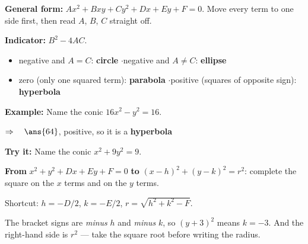 \documentclass[12pt]{article}
\begin{document}


\begin{formulabox}
\textbf{General form:} $Ax^2 + Bxy + Cy^2 + Dx + Ey + F = 0$. Move every term to one side
first, then read $A$, $B$, $C$ straight off.\par
\smallskip
\textbf{Indicator:} $B^2 - 4AC$.
\begin{itemize}[label={$\bullet$}, leftmargin=1.0cm, itemsep=0pt, topsep=1pt]
  \item negative and $A = C$: \textbf{circle} \quad$\cdot$\quad negative and $A \neq C$:
        \textbf{ellipse}
  \item zero (only one squared term): \textbf{parabola} \quad$\cdot$\quad positive
        (squares of opposite sign): \textbf{hyperbola}
\end{itemize}
\end{formulabox}

\begin{examplebox}
\textbf{Example:} \quad Name the conic $16x^2 - y^2 = 16$.

$\Rightarrow\quad \ans{64}$, positive, so it is a \textbf{hyperbola}
\end{examplebox}

\begin{tryitbox}
\textbf{Try it:} \quad Name the conic $x^2 + 9y^2 = 9$.\\[2pt]
\end{tryitbox}


\begin{formulabox}
\textbf{From} $x^2 + y^2 + Dx + Ey + F = 0$ \textbf{to} $(x-h)^2 + (y-k)^2 = r^2$:
complete the square on the $x$ terms and on the $y$ terms.\par
\smallskip
Shortcut: $h = -D/2$, \quad $k = -E/2$, \quad $r = \sqrt{h^2 + k^2 - F}$.\par
\smallskip
The bracket signs are \emph{minus} $h$ and \emph{minus} $k$, so $(y+3)^2$ means $k = -3$.
And the right-hand side is $r^2$ --- take the square root before writing the radius.
\end{formulabox}
\end{document}
